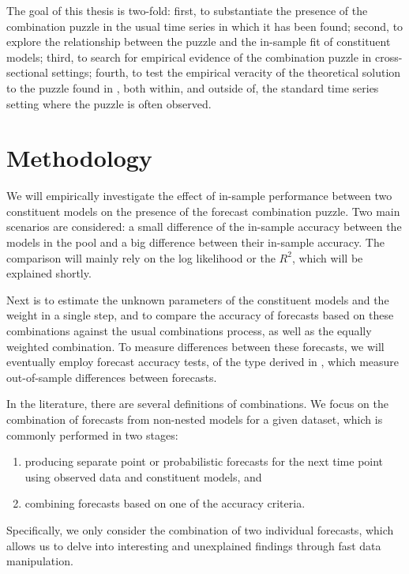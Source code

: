 \documentclass{monashthesis}
\begin{document}
The goal of this thesis is two-fold: first, to substantiate the presence of the combination puzzle in the usual time series in which it has been found; second, to explore the relationship between the puzzle and the in-sample fit of constituent models; third, to search for empirical evidence of the combination puzzle in cross-sectional settings; fourth, to test the empirical veracity of the theoretical solution to the puzzle found in \textcite{FZMP23}, both within, and outside of, the standard time series setting where the puzzle is often observed.

\hypertarget{method}{%
\chapter{Methodology}\label{method}}

We will empirically investigate the effect of in-sample performance between two constituent models on the presence of the forecast combination puzzle. Two main scenarios are considered: a small difference of the in-sample accuracy between the models in the pool and a big difference between their in-sample accuracy. The comparison will mainly rely on the log likelihood or the \(R^2\), which will be explained shortly.

Next is to estimate the unknown parameters of the constituent models and the weight in a single step, and to compare the accuracy of forecasts based on these combinations against the usual combinations process, as well as the equally weighted combination. To measure differences between these forecasts, we will eventually employ forecast accuracy tests, of the type derived in \textcite{W96}, which measure out-of-sample differences between forecasts.

In the literature, there are several definitions of combinations. We focus on the combination of forecasts from non-nested models for a given dataset, which is commonly performed in two stages:

\begin{enumerate}
\def\labelenumi{\arabic{enumi}.}
\item
  producing separate point or probabilistic forecasts for the next time point using observed data and constituent models, and
\item
  combining forecasts based on one of the accuracy criteria.
\end{enumerate}

Specifically, we only consider the combination of two individual forecasts, which allows us to delve into interesting and unexplained findings through fast data manipulation.
\end{document}
